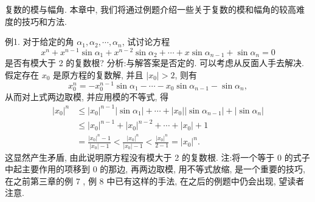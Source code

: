 
复数的模与幅角.
本章中, 我们将通过例题介绍一些关于复数的模和幅角的较高难度的技巧和方法.



例1. 对于给定的角 $\alpha_1, \alpha_2, \cdots, \alpha_n$, 试讨论方程
$$
x^n+x^{n-1} \sin \alpha_1+x^{n-2} \sin \alpha_2+\cdots+x \sin \alpha_{n-1}+\sin \alpha_n=0
$$
是否有模大于 2 的复数根?
分析:与解答案是否定的.
可以考虑从反面人手去解决.
假定存在 $x_0$ 是原方程的复数解, 并且 $\left|x_0\right|>2$, 则有
$$
x_0^n=-x_0^{n-1} \sin \alpha_1-\cdots-x_0 \sin \alpha_{n-1}-\sin \alpha_n,
$$
从而对上式两边取模, 并应用模的不等式, 得
$$
\begin{aligned}
\left|x_0\right|^n & \leqslant\left|x_0\right|^{n-1}\left|\sin \alpha_1\right|+\cdots+\left|x_0\right|\left|\sin \alpha_{n-1}\right|+\left|\sin \alpha_n\right| \\
& \leqslant\left|x_0\right|^{n-1}+\left|x_0\right|^{n-2}+\cdots+\left|x_0\right|+1 \\
& =\frac{\left|x_0\right|^n-1}{\left|x_0\right|-1}<\frac{\left|x_0\right|^n}{\left|x_0\right|-1}<\frac{\left|x_0\right|^n}{2-1}=\left|x_0\right|^n .
\end{aligned}
$$
这显然产生矛盾, 由此说明原方程没有模大于 2 的复数根.
注:将一个等于 0 的式子中起主要作用的项移到 0 的那边, 再两边取模, 用不等式放缩, 是一个重要的技巧, 在之前第三章的例 7 , 例 8 中已有这样的手法, 在之后的例题中仍会出现, 望读者注意.



